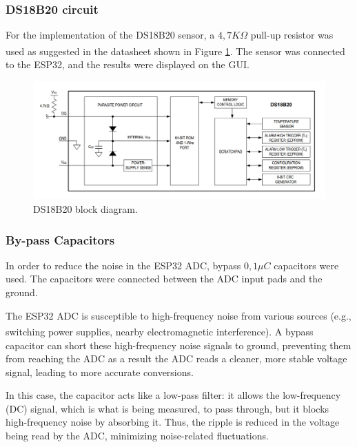\documentclass[12pt]{article}
\begin{document}
\subsubsection{DS18B20 circuit}

For the implementation of the DS18B20 sensor, a $4,7K\Omega$ pull-up resistor was used as suggested in the datasheet\textsuperscript{\cite{DS18B20_datasheet}} shown in Figure \ref{fig:ds-block-diagram}. The sensor was connected to the ESP32, and the results were displayed on the GUI. 

\begin{figure}[H] 
    \centering
    \includegraphics*[scale = 0.4]{images/Ds_block_diagram.png}
    \caption{DS18B20 block diagram.}
    \label{fig:ds-block-diagram}
\end{figure}

\subsubsection{By-pass Capacitors}

In order to reduce the noise in the ESP32 ADC, bypass $0,1\mu C$ capacitors were used. The capacitors were connected between the ADC input pads and the ground.

The ESP32 ADC is susceptible to high-frequency noise from various sources (e.g., switching power supplies, nearby electromagnetic interference)\textsuperscript{\cite{ESP-IDF-Programming-Guide}}. A bypass capacitor can short these high-frequency noise signals to ground, preventing them from reaching the ADC as a result the ADC reads a cleaner, more stable voltage signal, leading to more accurate conversions.

In this case, the capacitor acts like a low-pass filter: it allows the low-frequency (DC) signal, which is what is being measured, to pass through, but it blocks high-frequency noise by absorbing it. Thus, the ripple is reduced in the voltage being read by the ADC, minimizing noise-related fluctuations.
\end{document}
